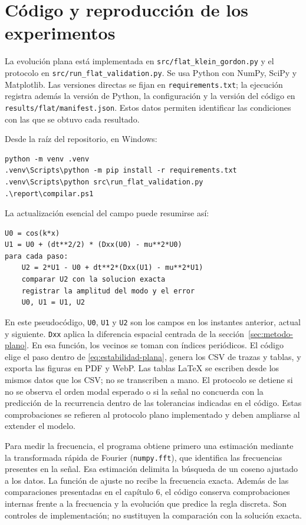 \section{Código y reproducción de los experimentos}
\label{sec:reproduccion-plana}

La evolución plana está implementada en \texttt{src/flat\_klein\_gordon.py}
y el protocolo en \texttt{src/run\_flat\_validation.py}. Se usa Python con
NumPy, SciPy y Matplotlib. Las versiones directas se fijan en
\texttt{requirements.txt}; la ejecución registra además la versión de Python,
la configuración y la versión del código en
\texttt{results/flat/manifest.json}. Estos datos permiten identificar
las condiciones con las que se obtuvo cada resultado.

Desde la raíz del repositorio, en Windows:
\begin{verbatim}
python -m venv .venv
.venv\Scripts\python -m pip install -r requirements.txt
.venv\Scripts\python src\run_flat_validation.py
.\report\compilar.ps1
\end{verbatim}

La actualización esencial del campo puede resumirse así:
\begin{verbatim}
U0 = cos(k*x)
U1 = U0 + (dt**2/2) * (Dxx(U0) - mu**2*U0)
para cada paso:
    U2 = 2*U1 - U0 + dt**2*(Dxx(U1) - mu**2*U1)
    comparar U2 con la solucion exacta
    registrar la amplitud del modo y el error
    U0, U1 = U1, U2
\end{verbatim}

En este pseudocódigo, \texttt{U0}, \texttt{U1} y \texttt{U2} son los campos
en los instantes anterior, actual y siguiente. \texttt{Dxx} aplica la
diferencia espacial centrada de la sección~\ref{sec:metodo-plano}. En esa función, los vecinos se toman con índices periódicos. El código
elige el paso dentro de \eqref{eq:estabilidad-plana}, genera los CSV de
trazas y tablas, y exporta las figuras en PDF y WebP. Las tablas LaTeX se
escriben desde los mismos datos que los CSV; no se transcriben a mano.
El protocolo se detiene si no se observa el orden modal esperado o si la
señal no concuerda con la predicción de la recurrencia dentro de las tolerancias
indicadas en el código. Estas comprobaciones se refieren al protocolo
plano implementado y deben ampliarse al extender el modelo.

Para medir la frecuencia, el programa obtiene primero una estimación
mediante la transformada rápida de Fourier (\texttt{numpy.fft}), que
identifica las frecuencias presentes en la señal. Esa estimación delimita
la búsqueda de un coseno ajustado a los datos. La función de ajuste no
recibe la frecuencia exacta. Además de las comparaciones presentadas en
el capítulo 6, el código conserva comprobaciones internas frente a la
frecuencia y la evolución que predice la regla discreta. Son controles
de implementación; no sustituyen la comparación con la solución exacta.

